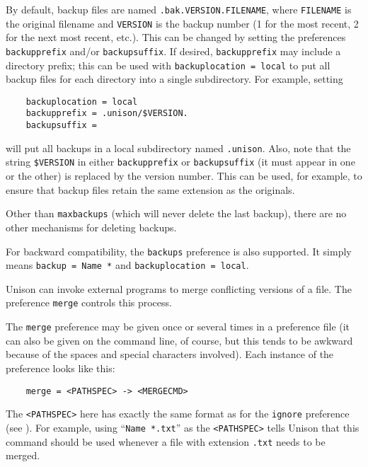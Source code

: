 \documentclass{article}
\begin{document}
By default, backup files are named \verb|.bak.VERSION.FILENAME|,
where \verb|FILENAME| is the original filename and \verb|VERSION| is the
backup number (1 for the most recent, 2 for the next most recent,
etc.).  This can be changed by setting the preferences \verb|backupprefix|
and/or \verb|backupsuffix|.  If desired, \verb|backupprefix| may include a
directory prefix; this can be used with \verb|backuplocation = local| to put all
backup files for each directory into a single subdirectory.  For example, setting
\begin{verbatim}
    backuplocation = local
    backupprefix = .unison/$VERSION.
    backupsuffix =
\end{verbatim}
will put all backups in a local subdirectory named \verb|.unison|.  Also,
note that the string \verb|$VERSION| in either \verb|backupprefix| or
\verb|backupsuffix| (it must appear in one or the other) is replaced by
the version number.  This can be used, for example, to ensure that backup
files retain the same extension as the originals.

Other than \verb|maxbackups| (which will never delete the last
backup), there are no other mechanisms for deleting backups.

For backward compatibility, the \verb|backups| preference is also supported.
%
It simply means \verb|backup = Name *| and \verb|backuplocation = local|.



Unison can invoke external programs to merge conflicting versions of a file.
The preference \verb|merge| controls this process.

The \verb|merge| preference may be given once or several times in a
preference file (it can also be given on the command line, of course, but
this tends to be awkward because of the spaces and special characters
involved).  Each instance of the preference looks like this:
\begin{verbatim}
    merge = <PATHSPEC> -> <MERGECMD>
\end{verbatim}
The \verb|<PATHSPEC>| here has exactly the same format as for the
\verb|ignore| preference (see ).  For example,
using ``\verb|Name *.txt|'' as the \verb|<PATHSPEC>| tells Unison that this
command should be used whenever a file with extension \verb|.txt| needs to
be merged.
\end{document}
